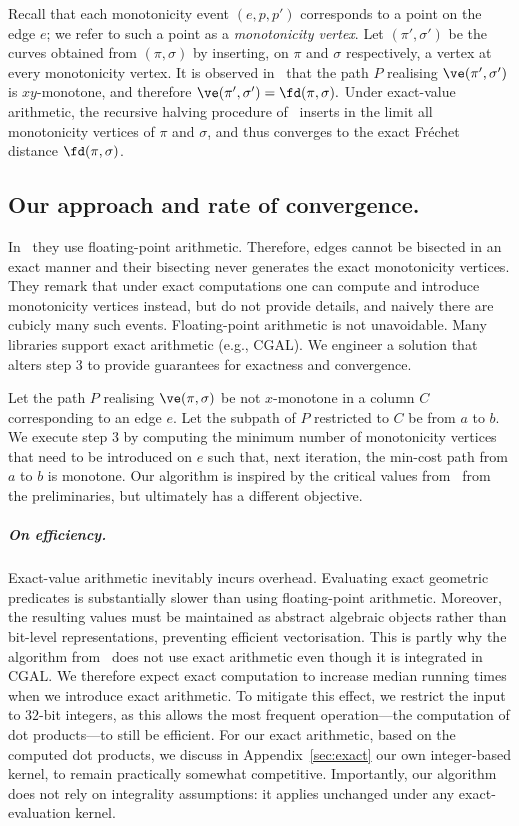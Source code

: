 Recall that each monotonicity event $(e,p,p')$ corresponds to a point on the edge $e$; we refer to such a point as a \emph{monotonicity vertex}.  
Let $(\pi',\sigma')$ be the curves obtained from $(\pi,\sigma)$ by inserting, on $\pi$ and $\sigma$ respectively, a vertex at every monotonicity vertex.
It is observed in~\cite{harpeled_et_al:LIPIcs.SoCG.2025.54} that the path $P$ realising $\ve(\pi',\sigma')$ is $xy$-monotone, and therefore $
  \ve(\pi',\sigma') = \fd(\pi,\sigma).$
Under exact-value arithmetic, the recursive halving procedure of~\cite{harpeled_et_al:LIPIcs.SoCG.2025.54} inserts in the limit all monotonicity vertices of $\pi$ and $\sigma$, and thus converges to the exact Fréchet distance $\fd(\pi,\sigma)$.


\subsection{Our approach and rate of convergence.}

In~\cite{harpeled_et_al:LIPIcs.SoCG.2025.54} they use floating-point arithmetic. 
Therefore,  edges cannot be bisected in an exact manner and their bisecting never generates the exact monotonicity vertices. 
They remark that under exact computations one can compute and introduce monotonicity vertices instead, but do not provide details, and naively there are cubicly many such events. 
Floating-point arithmetic is not unavoidable. Many libraries support exact arithmetic (e.g., CGAL). We engineer a solution that alters step 3 to provide guarantees for exactness and convergence. 

Let the path $P$ realising $\ve(\pi, \sigma)$ be not $x$-monotone in a column $C$ corresponding to an edge $e$. 
Let the subpath of $P$ restricted to $C$ be from $a$ to $b$. We execute step 3 by computing the minimum number of monotonicity vertices that need to be introduced on $e$ such that, next iteration, the min-cost path from  $a$ to $b$ is monotone.
Our algorithm is inspired by the critical values from~\cite{alt1995computing, HarPeled2011Frechet} from the preliminaries, but ultimately has a different objective.

\subparagraph{On efficiency.}
Exact-value arithmetic inevitably incurs overhead.  
Evaluating exact geometric predicates is substantially slower than using floating-point arithmetic. Moreover, the resulting values must be maintained as abstract algebraic objects rather than bit-level representations, preventing efficient vectorisation. This is partly why the algorithm from~\cite{bringmann2019Walking} does not use exact arithmetic even though it is integrated in CGAL. 
We therefore expect exact computation to increase median running times when we introduce exact arithmetic. 
To mitigate this effect, we restrict the input to $32$-bit integers, as this allows the most frequent operation---the computation of dot products---to still be efficient. For our exact arithmetic, based on the computed dot products, we discuss in Appendix~\ref{sec:exact} our own integer-based kernel, to remain practically somewhat competitive. 
Importantly, our algorithm does not rely on integrality assumptions: it applies unchanged under any exact-evaluation kernel.

